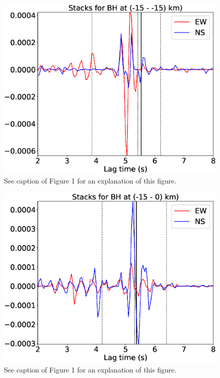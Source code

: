 \documentclass[letterpaper, 12pt]{article}
\begin{document}
\begin{figure}[H]
\includegraphics[width=\linewidth]{figures/intervals/BH_-15_-15_stacks.eps}
\caption{See caption of Figure 1 for an explanation of this figure.}
\end{figure}

\begin{figure}[H]
\includegraphics[width=\linewidth]{figures/intervals/BH_-15_000_stacks.eps}
\caption{See caption of Figure 1 for an explanation of this figure.}
\end{figure}
\end{document}
